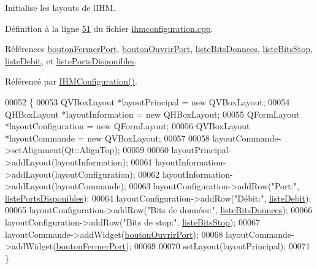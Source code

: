 Initialise les layouts de l\textquotesingle{}I\+HM. 



Définition à la ligne \hyperlink{ihmconfiguration_8cpp_source_l00051}{51} du fichier \hyperlink{ihmconfiguration_8cpp_source}{ihmconfiguration.\+cpp}.



Références \hyperlink{ihmconfiguration_8h_source_l00030}{bouton\+Fermer\+Port}, \hyperlink{ihmconfiguration_8h_source_l00029}{bouton\+Ouvrir\+Port}, \hyperlink{ihmconfiguration_8h_source_l00027}{liste\+Bits\+Donnees}, \hyperlink{ihmconfiguration_8h_source_l00028}{liste\+Bits\+Stop}, \hyperlink{ihmconfiguration_8h_source_l00026}{liste\+Debit}, et \hyperlink{ihmconfiguration_8h_source_l00025}{liste\+Ports\+Disponibles}.



Référencé par \hyperlink{ihmconfiguration_8cpp_source_l00009}{I\+H\+M\+Configuration()}.


\begin{DoxyCode}
00052 \{
00053     QVBoxLayout *layoutPrincipal = \textcolor{keyword}{new} QVBoxLayout;
00054     QHBoxLayout *layoutInformation = \textcolor{keyword}{new} QHBoxLayout;
00055     QFormLayout *layoutConfiguration = \textcolor{keyword}{new} QFormLayout;
00056     QVBoxLayout *layoutCommande = \textcolor{keyword}{new} QVBoxLayout;
00057 
00058     layoutCommande->setAlignment(Qt::AlignTop);
00059 
00060     layoutPrincipal->addLayout(layoutInformation);
00061     layoutInformation->addLayout(layoutConfiguration);
00062     layoutInformation->addLayout(layoutCommande);
00063     layoutConfiguration->addRow(\textcolor{stringliteral}{"Port:"}, \hyperlink{class_i_h_m_configuration_af3ce74444e24237aedf1d2ef2053b574}{listePortsDisponibles});
00064     layoutConfiguration->addRow(\textcolor{stringliteral}{"Débit:"}, \hyperlink{class_i_h_m_configuration_a98e8133a04509b3a80b232d2f031e81f}{listeDebit});
00065     layoutConfiguration->addRow(\textcolor{stringliteral}{"Bits de données:"}, \hyperlink{class_i_h_m_configuration_a83c61d075d53758bd753aada9a0bb452}{listeBitsDonnees});
00066     layoutConfiguration->addRow(\textcolor{stringliteral}{"Bits de stop:"}, \hyperlink{class_i_h_m_configuration_a16ae724388b797983c78e87e7d5485cb}{listeBitsStop});
00067     layoutCommande->addWidget(\hyperlink{class_i_h_m_configuration_a824b7f6c0d332b8f6f76801e545b14ad}{boutonOuvrirPort});
00068     layoutCommande->addWidget(\hyperlink{class_i_h_m_configuration_a25c0b3c51a8d162ae3439a56ec644909}{boutonFermerPort});
00069 
00070     setLayout(layoutPrincipal);
00071 \}
\end{DoxyCode}
\mbox{\label{class_i_h_m_configuration_a76fe56bbd88aef5581186e05fb4ae67f}} 
